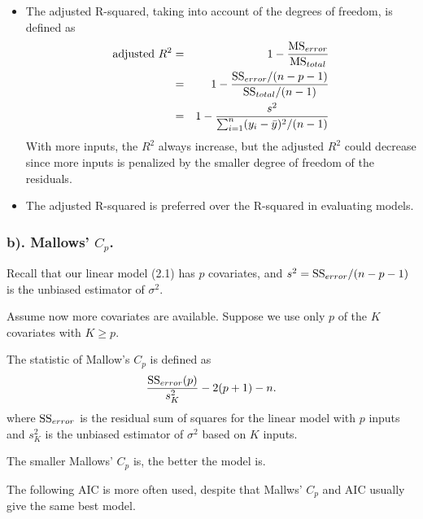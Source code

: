 \documentclass{beamer}
\begin{document}
      
      
      
      \begin{frame}
      	\frametitle{ }
      	\begin{itemize}
      		
      		\item  
      		The adjusted R-squared, taking into account of the degrees of freedom,   is defined as
      		\begin{eqnarray*}
      			\hbox{adjusted} \,\, R^2 &= & 1- { \hbox{MS}_{error} \over \hbox{MS}_{total}} \\
      			&= & 1- {\hbox{SS}_{error} /(n-p-1) \over \hbox{SS}_{total}/(n-1) }\\
      			&= &1 - {s^2 \over \sum_{i=1}^n (y_i - \bar y)^2/(n-1) }
      		\end{eqnarray*}
      		With more inputs, the $R^2$ always increase, but the adjusted $R^2$ could decrease since
      		more inputs is penalized by the smaller degree of freedom of the residuals.
      		
      		\item
      		The adjusted R-squared is preferred over the R-squared in evaluating models.
      		
      	\end{itemize}
      \end{frame}
      
      \begin{frame}
      	\frametitle{b). Mallows' $C_p$. }
      	
      	Recall that our linear model (2.1) has $p$ covariates, and $s^2= \hbox{SS}_{error}/(n-p-1)$ is
      	the unbiased estimator of $\sigma^2$. 
      	
      	Assume now more covariates are available.
      	Suppose we use only $p$ of the $K$ covariates with $K \geq p$.
      	
      	
      	The statistic of Mallow's $C_p$ is defined as
      	$$ {\hbox{SS}_{error}(p) \over s^2_K} - 2(p+1) -n.$$
      	where $\hbox{SS}_{error}$ is the residual sum of squares for the linear  model with $p$ inputs
      	and $s^2_K$ is the unbiased estimator of $\sigma^2$ based on $K$ inputs.
      	
      	
      	The smaller Mallows' $C_p$ is, the better the model is. 
      	
      	The following AIC is more often used,
      	despite that Mallws' $C_p$ and AIC usually give the same best model.
      	
      \end{frame}
      
\end{document}
